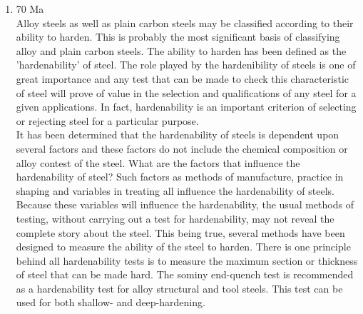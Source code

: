 \documentclass[12pt]{article}
\begin{document}
\begin{enumerate}
      Other studies have produced mixed findings. One study showed that laboratory rats reared in space could not figure out how to walk properly on Earth due to spinal-cord damage suffered in space. This study also showed that newborn pups, which are born blind, need gravity in order to learn how to hold themselves upright. Other findings confirm that adult subjects, including humans, can fairly easily recover balance and navigational abilities that have been lost in space.\\

      Clearly the importance of gravity in the development of human beings requires further study before individuals can be sent off to colonise space.

    \item 70 Ma\\
      Alloy steels as well as plain carbon steels may be classified according to their ability to harden. This is probably the most significant basis of classifying alloy and plain carbon steels. The ability to harden has been defined as the 'hardenability' of steel. The role played by the hardenibility of steels is one of great importance and any test that can be made to check this characteristic of steel will prove of value in the selection and qualifications of any steel for a given applications. In fact, hardenability is an important criterion of selecting or rejecting steel for a particular purpose.\\

      It has been determined that the hardenability of steels is dependent upon several factors and these factors do not include the chemical composition or alloy contest of the steel. What are the factors that influence the hardenability of steel? Such factors as methods of manufacture, practice in shaping and variables in treating all influence the hardenability of steels. Because these variables will influence the hardenability, the usual methods of testing, without carrying out a test for hardenability, may not reveal the complete story about the steel. This being true, several methods have been designed to measure the ability of the steel to harden. There is one principle behind all hardenability tests is to measure the maximum section or thickness of steel that can be made hard. The sominy end-quench test is recommended as a hardenability test for alloy structural and tool steels. This test can be used for both shallow- and deep-hardening.


\end{enumerate}
\end{document}
